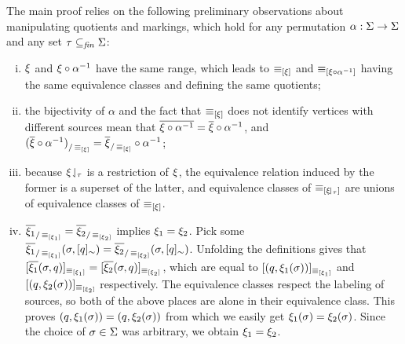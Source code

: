 \begin{proofE}
  The main proof relies on the following preliminary observations
  about manipulating quotients and markings, which hold for any
  permutation $\alpha : \Sigma\rightarrow\Sigma$ and any
  set $\tau\subseteq_{\mathit{fin}} \Sigma$:
  \begin{enumerate}[(i)]
    \item\label{it1:cong-beh-fold} $\xi$ and $\xi\circ\alpha^{-1}$
      have the same range, which leads to $\operatorname{{\equiv}}_{[\xi]}$
      and $\operatorname{{\equiv}}_{[\xi\circ\alpha^{-1}]}$ having the same
      equivalence classes and defining the same quotients;
    \item\label{it2:cong-beh-fold} the bijectivity of $\alpha$ and the fact that
      $\operatorname{{\equiv}}_{[\xi]}$
      does not identify vertices with different sources mean that
      $\overline{\xi\circ\alpha^{-1}} = \overline{\xi}\circ\alpha^{-1}$,
      and ${(\overline{\xi} \circ\alpha^{-1})}_{/\operatorname{{\equiv}}_{[\xi]}}
      = {\overline{\xi}}_{/\operatorname{{\equiv}}_{[\xi]}} \circ\alpha^{-1}$;
    \item\label{it3:cong-beh-fold} because ${\xi}\!\downharpoonleft_{\tau}$
      is a restriction of $\xi$,
      the equivalence relation induced by the former is a superset of the latter,
      and equivalence classes of $\operatorname{{\equiv}}_{[{\xi}\!\downharpoonleft_{\tau}]}$ are unions
      of equivalence classes of $\operatorname{{\equiv}}_{[\xi]}$.
    \item\label{it4:cong-beh-fold}
      ${\overline{\xi_1}}_{/\operatorname{{\equiv}}_{[\xi_1]}} =
      {\overline{\xi_2}}_{/\operatorname{{\equiv}}_{[\xi_2]}}$ implies
      $\xi_1 = \xi_2$.  Pick some
      ${\overline{\xi_1}}_{/\operatorname{{\equiv}}_{[\xi_1]}}(\sigma,[q]_\sim)
      =
      {\overline{\xi_2}}_{/\operatorname{{\equiv}}_{[\xi_2]}}(\sigma,[q]_\sim)$.
      Unfolding the definitions gives that
      $[\overline{\xi_1}(\sigma,q)]_{\operatorname{{\equiv}}_{[\xi_1]}} =
      [\overline{\xi_2}(\sigma,q)]_{\operatorname{{\equiv}}_{[\xi_2]}}$, which
      are equal to $[(q,\xi_1(\sigma))]_{\operatorname{{\equiv}}_{[\xi_1]}}$
      and $[(q,\xi_2(\sigma))]_{\operatorname{{\equiv}}_{[\xi_2]}}$
      respectively.  The equivalence classes respect the labeling of
      sources, so both of the above places are alone in their
      equivalence class.  This proves $(q,\xi_1(\sigma)) =
      (q,\xi_2(\sigma))$ from which we easily get
      $\xi_1(\sigma) = \xi_2(\sigma)$. Since the choice of
      $\sigma\in\Sigma$ was arbitrary, we obtain $\xi_1 =
      \xi_2$.
  \end{enumerate}


\end{proofE}

